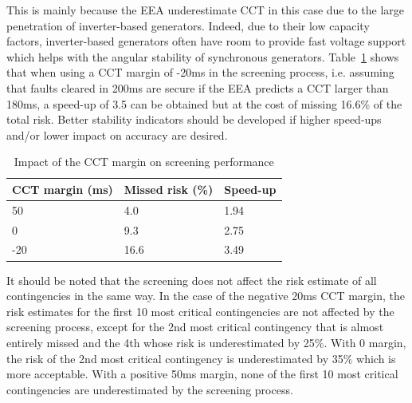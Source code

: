 This is mainly because the EEA underestimate CCT in this case due to the large penetration of inverter-based generators. Indeed, due to their low capacity factors, inverter-based generators often have room to provide fast voltage support which helps with the angular stability of synchronous generators. Table~\ref{tab:CCT_margin} shows that when using a CCT margin of -20ms in the screening process, i.e. assuming that faults cleared in 200ms are secure if the EEA predicts a CCT larger than 180ms, a speed-up of 3.5 can be obtained but at the cost of missing 16.6\% of the total risk. Better stability indicators should be developed if higher speed-ups and/or lower impact on accuracy are desired.

\begin{table}
  \centering
  \caption{Impact of the CCT margin on screening performance}
  \label{tab:CCT_margin}
  \begin{tabular}{@{}lll@{}}
  \toprule
  CCT margin (ms) & Missed risk (\%) & Speed-up \\ \midrule
  50  & 4.0  & 1.94 \\
  0   & 9.3  & 2.75 \\
  -20 & 16.6 & 3.49 \\ \bottomrule
  \end{tabular}
\end{table}

It should be noted that the screening does not affect the risk estimate of all contingencies in the same way. In the case of the negative 20ms CCT margin, the risk estimates for the first 10 most critical contingencies are not affected by the screening process, except for the 2nd most critical contingency that is almost entirely missed and the 4th whose risk is underestimated by 25\%. With 0 margin, the risk of the 2nd most critical contingency is underestimated by 35\% which is more acceptable. With a positive 50ms margin, none of the first 10 most critical contingencies are underestimated by the screening process.


